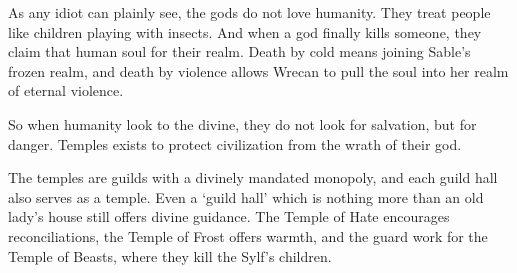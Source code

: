 \begin{multicols}{2}

\label{godsOfDeath}

As any idiot can plainly see, the gods do not love humanity.
They treat people like children playing with insects.
And when a god finally kills someone, they claim that human soul for their realm.
Death by cold means joining Sable's frozen realm, and death by violence allows Wrecan to pull the soul into her realm of eternal violence.

So when humanity look to the divine, they do not look for salvation, but for danger.
Temples exists to protect civilization from the wrath of their god.

The temples are guilds with a divinely mandated monopoly, and each guild hall also serves as a temple.
Even a `guild hall' which is nothing more than an old lady's house still offers divine guidance.
The Temple of Hate encourages reconciliations, the Temple of Frost offers warmth, and the \gls{guard} work for the Temple of Beasts, where they kill the Sylf's children.

\newcommand\guild[8]{
  \renewcommand\npcsymbol{#2}
  \vspace{2em}
  \noindent
  \begin{minipage}{\linewidth}
  \subsection[The Temple of #3]{#2~#1~#2 \\ \& \\ The Temple of #3}
  \ifdefmacro{#1}{}{\index{#1}\label{god:#1}}
  \index{#3 (God)}\label{god:#3}
  \ifdefmacro{#7}{}{\index{#7}\label{guild:#7}}
  \index{Gods}

  \begin{exampletext}
  \noindent
  #4
  \end{exampletext}
  \end{minipage}

  \noindent
  \begin{minipage}{\linewidth}
  \begin{description}
  \item[Domain:] #5

  \item[Defence:] #6

  \item[Watchers:] #7

  \item[Activities:] #8


\end{description}
\end{minipage}}
\end{multicols}
